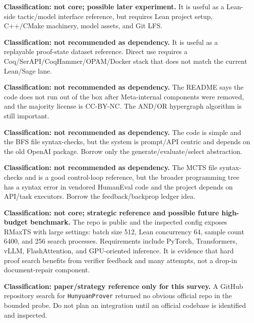 \documentclass[11pt]{article}
\begin{document}
\begin{description}[style=nextline,leftmargin=0pt]
\item[Lean Copilot.] \textbf{Classification: not core; possible later
experiment.} It is useful as a Lean-side tactic/model interface reference, but
requires Lean project setup, C++/CMake machinery, model assets, and Git LFS.

\item[CoqGym.] \textbf{Classification: not recommended as dependency.} It is
useful as a replayable proof-state dataset reference. Direct use requires a
Coq/SerAPI/CoqHammer/OPAM/Docker stack that does not match the current Lean/Sage
lane.

\item[Evariste / HTPS.] \textbf{Classification: not recommended as dependency.}
The README says the code does not run out of the box after Meta-internal
components were removed, and the majority license is CC-BY-NC. The AND/OR
hypergraph algorithm is still important.

\item[Tree of Thoughts.] \textbf{Classification: not recommended as dependency.}
The code is simple and the BFS file syntax-checks, but the system is prompt/API
centric and depends on the old OpenAI package. Borrow only the
generate/evaluate/select abstraction.

\item[Language Agent Tree Search.] \textbf{Classification: not recommended as
dependency.} The MCTS file syntax-checks and is a good control-loop reference,
but the broader programming tree has a syntax error in vendored HumanEval code
and the project depends on API/task executors. Borrow the feedback/backprop
ledger idea.

\item[DeepSeek-Prover-V1.5.] \textbf{Classification: not core; strategic
reference and possible future high-budget benchmark.} The repo is public and
the inspected config exposes RMaxTS with large settings: batch size 512, Lean
concurrency 64, sample count 6400, and 256 search processes. Requirements
include PyTorch, Transformers, vLLM, FlashAttention, and GPU-oriented inference.
It is evidence that hard proof search benefits from verifier feedback and many
attempts, not a drop-in document-repair component.

\item[HunyuanProver.] \textbf{Classification: paper/strategy reference only for
this survey.} A GitHub repository search for \texttt{HunyuanProver} returned no
obvious official repo in the bounded probe. Do not plan an integration until an
official codebase is identified and inspected.


\end{description}
\end{document}
